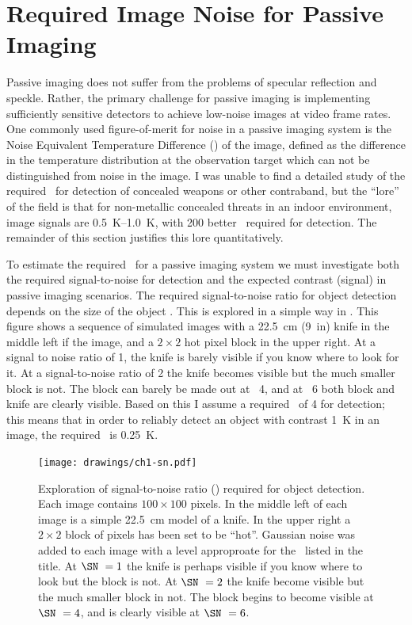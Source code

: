 \section{Required Image Noise for Passive Imaging} \label{sec:ch1-netd-reqs}

Passive imaging does not suffer from the problems of specular reflection and speckle.
Rather, the primary challenge for passive imaging is implementing sufficiently sensitive detectors to achieve low-noise images at video frame rates.
One commonly used figure-of-merit for noise in a passive imaging system is the Noise Equivalent Temperature Difference (\NETD) of the image, defined as the difference in the temperature distribution at the observation target which can not be distinguished from noise in the image.
I was unable to find a detailed study of the required \NETD\ for detection of concealed weapons or other contraband, but the ``lore'' of the field is that for non-metallic concealed threats in an indoor environment, image signals are \SIrange{0.5}{1.0}{\K}, with \SI{200}{\mK}  better \NETD\ required for detection.
The remainder of this section justifies this lore quantitatively.

To estimate the required \NETD\ for a passive imaging system we must investigate both the required signal-to-noise for detection and the expected contrast (signal) in passive imaging scenarios.
The required signal-to-noise ratio for object detection depends on the size of the object \cite{steven_w._smith_scientist_1997}.
This is explored in a simple way in .
This figure shows a sequence of simulated images with a \SI{22.5}{\cm} (\SI{9}{in}) knife in the middle left if the image, and a $2\times2$ hot pixel block in the upper right.
At a signal to noise ratio of 1, the knife is barely visible if you know where to look for it.
At a signal-to-noise ratio of 2 the knife becomes visible but the much smaller block is not.
The block can barely be made out at \SN\ 4, and at \SN\ 6 both block and knife are clearly visible.
Based on this I assume a required \SN\  of 4 for detection; this means that in order to reliably detect an object with contrast \SI{1}{\K} in an image, the required \NETD\ is \SI{0.25}{\K}.

\begin{figure}
\centering
\texttt{[image: drawings/ch1-sn.pdf]}
\caption[xxx]{
  Exploration of signal-to-noise ratio (\SN) required for object detection.
  Each image contains $100 \times 100$ pixels.
  In the middle left of each image is a simple \SI{22.5}{\cm} model of a knife.
  In the upper right a $2\times2$ block of pixels has been set to be ``hot''.
  Gaussian noise was added to each image with a level approproate for the \SN\ listed in the title.
  At $\SN\ = 1$ the knife is perhaps visible if you know where to look but the block is not.
  At $\SN\ = 2$ the knife become visible but the much smaller block in not.
  The block begins to become visible at $\SN\ = 4$, and is clearly visible at $\SN\ = 6$.
}
\label{fig:ch1-sn}
\end{figure}

